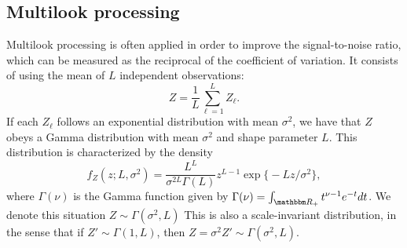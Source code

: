 \documentclass{beamer}
\begin{document}
\subsection{Multilook processing}
\begin{frame}

Multilook processing is often applied in order to improve the signal-to-noise ratio, which can be measured as the reciprocal of the coefficient of variation.
It consists of using the mean of $L$ independent observations:
\begin{equation}
Z = \frac1L \sum_{\ell=1}^{L} Z_\ell.
\end{equation}
If each $Z_\ell$ follows an exponential distribution with mean $\sigma^2$, we have that $Z$ obeys a Gamma distribution with mean $\sigma^2$ and shape parameter $L$.
This distribution is characterized by the density
\begin{equation}
f_Z(z;L,\sigma^2) = \frac{L^L}{\sigma^{2L}\Gamma(L)} z^{L-1} 
	\exp\big\{ -L z / \sigma^2
	\big\},
	\label{eq:SARGammaDensity}
\end{equation}
where $\Gamma(\nu)$ is the Gamma function given by $\Gamma(\nu)=\int_{\mathbbm R_+} t^{\nu-1} e^{-t} dt$.
We denote this situation $Z\sim\Gamma(\sigma^2,L)$
This is also a scale-invariant distribution, in the sense that if $Z'\sim\Gamma(1,L)$, then $Z=\sigma^2 Z'\sim \Gamma(\sigma^2,L)$.
\end{frame}
\end{document}
